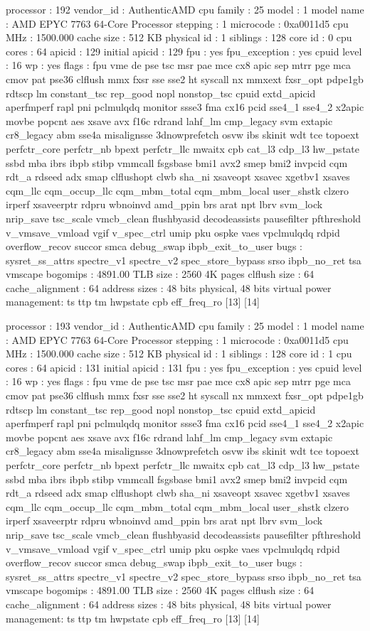 processor	: 192
vendor_id	: AuthenticAMD
cpu family	: 25
model		: 1
model name	: AMD EPYC 7763 64-Core Processor
stepping	: 1
microcode	: 0xa0011d5
cpu MHz		: 1500.000
cache size	: 512 KB
physical id	: 1
siblings	: 128
core id		: 0
cpu cores	: 64
apicid		: 129
initial apicid	: 129
fpu		: yes
fpu_exception	: yes
cpuid level	: 16
wp		: yes
flags		: fpu vme de pse tsc msr pae mce cx8 apic sep mtrr pge mca cmov pat pse36 clflush mmx fxsr sse sse2 ht syscall nx mmxext fxsr_opt pdpe1gb rdtscp lm constant_tsc rep_good nopl nonstop_tsc cpuid extd_apicid aperfmperf rapl pni pclmulqdq monitor ssse3 fma cx16 pcid sse4_1 sse4_2 x2apic movbe popcnt aes xsave avx f16c rdrand lahf_lm cmp_legacy svm extapic cr8_legacy abm sse4a misalignsse 3dnowprefetch osvw ibs skinit wdt tce topoext perfctr_core perfctr_nb bpext perfctr_llc mwaitx cpb cat_l3 cdp_l3 hw_pstate ssbd mba ibrs ibpb stibp vmmcall fsgsbase bmi1 avx2 smep bmi2 invpcid cqm rdt_a rdseed adx smap clflushopt clwb sha_ni xsaveopt xsavec xgetbv1 xsaves cqm_llc cqm_occup_llc cqm_mbm_total cqm_mbm_local user_shstk clzero irperf xsaveerptr rdpru wbnoinvd amd_ppin brs arat npt lbrv svm_lock nrip_save tsc_scale vmcb_clean flushbyasid decodeassists pausefilter pfthreshold v_vmsave_vmload vgif v_spec_ctrl umip pku ospke vaes vpclmulqdq rdpid overflow_recov succor smca debug_swap ibpb_exit_to_user
bugs		: sysret_ss_attrs spectre_v1 spectre_v2 spec_store_bypass srso ibpb_no_ret tsa vmscape
bogomips	: 4891.00
TLB size	: 2560 4K pages
clflush size	: 64
cache_alignment	: 64
address sizes	: 48 bits physical, 48 bits virtual
power management: ts ttp tm hwpstate cpb eff_freq_ro [13] [14]

processor	: 193
vendor_id	: AuthenticAMD
cpu family	: 25
model		: 1
model name	: AMD EPYC 7763 64-Core Processor
stepping	: 1
microcode	: 0xa0011d5
cpu MHz		: 1500.000
cache size	: 512 KB
physical id	: 1
siblings	: 128
core id		: 1
cpu cores	: 64
apicid		: 131
initial apicid	: 131
fpu		: yes
fpu_exception	: yes
cpuid level	: 16
wp		: yes
flags		: fpu vme de pse tsc msr pae mce cx8 apic sep mtrr pge mca cmov pat pse36 clflush mmx fxsr sse sse2 ht syscall nx mmxext fxsr_opt pdpe1gb rdtscp lm constant_tsc rep_good nopl nonstop_tsc cpuid extd_apicid aperfmperf rapl pni pclmulqdq monitor ssse3 fma cx16 pcid sse4_1 sse4_2 x2apic movbe popcnt aes xsave avx f16c rdrand lahf_lm cmp_legacy svm extapic cr8_legacy abm sse4a misalignsse 3dnowprefetch osvw ibs skinit wdt tce topoext perfctr_core perfctr_nb bpext perfctr_llc mwaitx cpb cat_l3 cdp_l3 hw_pstate ssbd mba ibrs ibpb stibp vmmcall fsgsbase bmi1 avx2 smep bmi2 invpcid cqm rdt_a rdseed adx smap clflushopt clwb sha_ni xsaveopt xsavec xgetbv1 xsaves cqm_llc cqm_occup_llc cqm_mbm_total cqm_mbm_local user_shstk clzero irperf xsaveerptr rdpru wbnoinvd amd_ppin brs arat npt lbrv svm_lock nrip_save tsc_scale vmcb_clean flushbyasid decodeassists pausefilter pfthreshold v_vmsave_vmload vgif v_spec_ctrl umip pku ospke vaes vpclmulqdq rdpid overflow_recov succor smca debug_swap ibpb_exit_to_user
bugs		: sysret_ss_attrs spectre_v1 spectre_v2 spec_store_bypass srso ibpb_no_ret tsa vmscape
bogomips	: 4891.00
TLB size	: 2560 4K pages
clflush size	: 64
cache_alignment	: 64
address sizes	: 48 bits physical, 48 bits virtual
power management: ts ttp tm hwpstate cpb eff_freq_ro [13] [14]

